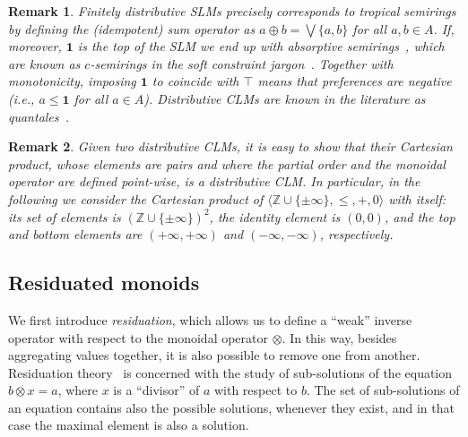 \documentclass[a4paper]{elsarticle}
\newtheorem{remark}{Remark}
\newtheorem{lemma}{Lemma}
\newcommand{\1}{\mathbf{1}}
\begin{document}
% 
% 

\begin{remark}
	Finitely distributive SLMs precisely corresponds to \emph{tropical} semirings 
	by defining the (idempotent) sum operator as
	$a \oplus b = \bigvee \{a, b\}$ for all $a,b \in A$.
	If, moreover, $\1$ is the top of the SLM we end up 
	with \emph{absorptive} semirings~\cite{golan}, 
	which are known as $c$-semirings 
	in the soft constraint jargon~\cite{jacm97}.
	Together with monotonicity, imposing $\1$ to coincide with $\top$ means 
	that preferences are negative (i.e., $a \leq \1$ for all $a \in A$).
	Distributive CLMs are known in the literature as \emph{quantales}~\cite{quantales}.
\end{remark}

\begin{remark}
	\label{remark}
	Given two distributive CLMs, it is easy to show that their Cartesian product, whose elements are pairs and where the partial order and the monoidal operator are 
	defined point-wise, is a distributive CLM.
	In particular, in the following we consider the Cartesian product of
	$\langle \mathbb{Z} \cup \{\pm \infty\}, \leq, +, 0 \rangle$ with itself: its set of
	elements is $(\mathbb{Z} \cup \{\pm \infty\})^2$, the identity element is $(0,0)$,
	and the top and bottom elements are $(+\infty, +\infty)$ and $(-\infty, -\infty)$, respectively.
\end{remark}

\subsection{Residuated monoids}

We first introduce \emph{residuation}, which allows us to define a ``weak'' inverse 
operator with respect to the monoidal operator $\otimes$. 
In this way, besides aggregating values together, it is also possible to remove one from 
another. Residuation theory~\cite{golan} is concerned with the study of sub-solutions of the 
equation $b \otimes x = a$, where $x$ is a ``divisor'' of $a$ with respect to $b$. 
The set of sub-solutions of an equation contains also the 
possible solutions, whenever they exist, and in that case the maximal element is also a 
solution.
\end{document}
